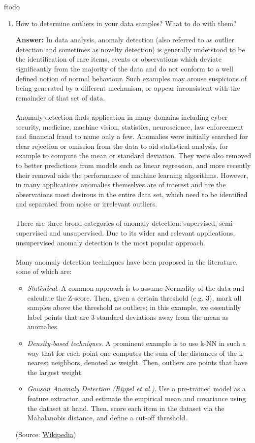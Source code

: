 ƒtodo\documentclass{article}
\newenvironment{QandA}{\begin{enumerate}[label=\arabic*.]}{\end{enumerate}}
\newenvironment{answer}{\par\normalfont \textbf{Answer:}}{}
\begin{document}
\begin{QandA}
    \item How to determine outliers in your data samples? What to do with them?
    \begin{answer}
        In data analysis, anomaly detection (also referred to as outlier detection and sometimes as novelty detection) is generally understood to be the identification of rare items, events or observations which deviate significantly from the majority of the data and do not conform to a well defined notion of normal behaviour. Such examples may arouse suspicions of being generated by a different mechanism, or appear inconsistent with the remainder of that set of data. \\\\
        Anomaly detection finds application in many domains including cyber security, medicine, machine vision, statistics, neuroscience, law enforcement and financial fraud to name only a few. Anomalies were initially searched for clear rejection or omission from the data to aid statistical analysis, for example to compute the mean or standard deviation. They were also removed to better predictions from models such as linear regression, and more recently their removal aids the performance of machine learning algorithms. However, in many applications anomalies themselves are of interest and are the observations most desirous in the entire data set, which need to be identified and separated from noise or irrelevant outliers. \\\\
        There are three broad categories of anomaly detection: supervised, semi-supervised and unsupervised. Due to its wider and relevant applications, unsupervised anomaly detection is the most popular approach. \\\\
        Many anomaly detection techniques have been proposed in the literature, some of which are:
        \begin{itemize}
            \item \textit{Statistical}. A common approach is to assume Normality of the data and calculate the Z-score. Then, given a certain threshold (e.g. 3), mark all samples above the threshold as outliers; in this example, we essentially label points that are 3 standard deviations away from the mean as anomalies. 
            \item \textit{Density-based techniques}. A prominent example is to use k-NN in such a way that for each point one computes the sum of the distances of the k nearest neighbors, denoted as weight. Then, outliers are points that have the largest weight. 
            \item \textit{Gausan Anomaly Detection (\href{https://ieeexplore.ieee.org/document/9493210}{Rippel et al.})}. Use a pre-trained model as a feature extractor, and estimate the empirical mean and covariance using the dataset at hand. Then, score each item in the dataset via the Mahalanobis distance, and define a cut-off threshold. 
        \end{itemize}
        (Source: \href{https://en.wikipedia.org/wiki/Anomaly_detection}{Wikipedia})
    \end{answer}


\end{QandA}
\end{document}
